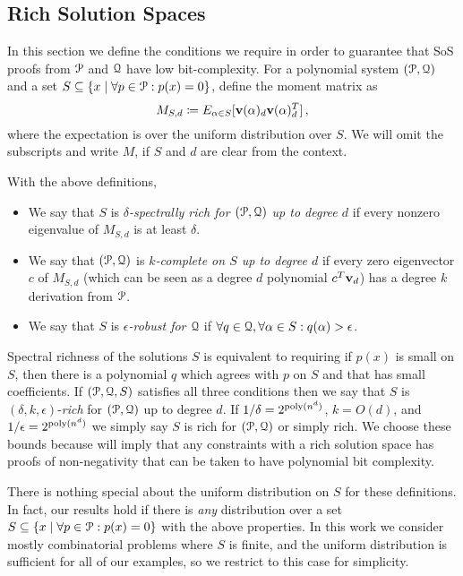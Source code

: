 \documentclass[a4paper,UKenglish]{lipics-v2016}
\begin{document}
\subsection{Rich Solution Spaces}
In this section we define the conditions we require in order to guarantee that SoS proofs from $\mathcal P$ and $\mathcal Q$ have low bit-complexity.
For a polynomial system $(\mathcal P, \mathcal Q)$ and a set $S \subseteq \{x \mid \forall p \in \mathcal P: p(x) = 0\}$, define the moment matrix as
\[M_{S,d} \coloneqq E_{\alpha \in S}[{\bf v}(\alpha)_d{\bf v}(\alpha)_d^T]\,,\]
where the expectation is over the uniform distribution over $S$.  We will omit the subscripts and write $M$, if $S$ and $d$ are clear from the context.

\begin{definition}\label{def:nice}
With the above definitions, 
\begin{itemize}
\item We say that $S$ is \emph{$\delta$-spectrally rich for $(\mathcal P, \mathcal Q)$ up to degree $d$} if every nonzero eigenvalue of $M_{S,d}$ is at least $\delta$.
\item We say that $(\mathcal P, \mathcal Q)$ is \emph{$k$-complete on $S$ up to degree $d$} if every zero eigenvector $c$ of $M_{S,d}$ (which can be seen as a degree $d$ polynomial $c^T{\bf v}_d$) has a degree $k$ derivation from $\mathcal P$. 
\item We say that $S$ is \emph{$\epsilon$-robust for $\mathcal Q$} if $\forall q \in \mathcal Q, \forall \alpha \in S: q(\alpha) > \epsilon$.
\end{itemize}
\end{definition}
Spectral richness of the solutions $S$ is equivalent to requiring if $p(x)$ is small on $S$, then there is a polynomial $q$ which agrees with $p$ on $S$ and that has small coefficients. If $(\mathcal P, \mathcal Q, S)$ satisfies all three conditions then we say that $S$ is $(\delta, k, \epsilon)$-\emph{rich} for $(\mathcal P, \mathcal Q)$ up to degree $d$. If $1/\delta = 2^{\operatorname{poly}(n^d)}$, $k = O(d)$, and $1/\epsilon = 2^{\operatorname{poly}(n^d)}$ we simply say $S$ is rich for $(\mathcal P, \mathcal Q)$ or simply rich. We choose these bounds because  will imply that any constraints with a rich solution space has proofs of non-negativity that can be taken to have polynomial bit complexity. 
\begin{remark}
There is nothing special about the uniform distribution on $S$ for these definitions. In fact, our results hold if there is \emph{any} distribution over a set $S \subseteq \{x \mid \forall p \in \mathcal P: p(x) = 0\}$ with the above properties. In this work we consider mostly combinatorial problems where $S$ is finite, and the uniform distribution is sufficient for all of our examples, so we restrict to this case for simplicity.
\end{remark}
\end{document}

